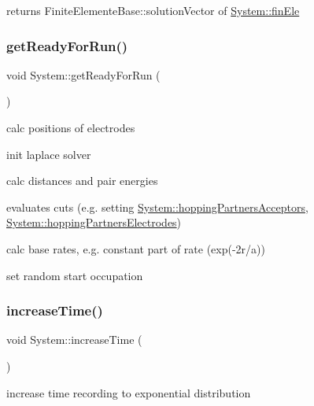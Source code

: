 returns Finite\+Elemente\+Base\+::solution\+Vector of \hyperlink{classSystem_a586a959bbcb019f061535e63d7a96852}{System\+::fin\+Ele} \mbox{\label{classSystem_a943bc42d8dc42ae1aaf1a5798ce723b8}} 
\subsubsection{\texorpdfstring{get\+Ready\+For\+Run()}{getReadyForRun()}}
{\footnotesize\ttfamily void System\+::get\+Ready\+For\+Run (\begin{DoxyParamCaption}{ }\end{DoxyParamCaption})}


\begin{DoxyItemize}
\item calc positions of electrodes
\item init laplace solver
\item calc distances and pair energies
\item evaluates cuts (e.\+g. setting \hyperlink{classSystem_ae9ca6aa54468effc1fae57c2adc6c578}{System\+::hopping\+Partners\+Acceptors}, \hyperlink{classSystem_a777232d4fec6f13fc7423a477f629a0f}{System\+::hopping\+Partners\+Electrodes})
\item calc base rates, e.\+g. constant part of rate (exp(-\/2r/a))
\item set random start occupation 
\end{DoxyItemize}\mbox{\label{classSystem_a6167b888fa30f9d8fa56a246c5f461b9}} 
\subsubsection{\texorpdfstring{increase\+Time()}{increaseTime()}}
{\footnotesize\ttfamily void System\+::increase\+Time (\begin{DoxyParamCaption}{ }\end{DoxyParamCaption})\hspace{0.3cm}{\ttfamily [private]}}

increase time recording to exponential distribution \mbox{\label{classSystem_a4fddf46176e76cc8d9e1ef91d38d82be}} 
